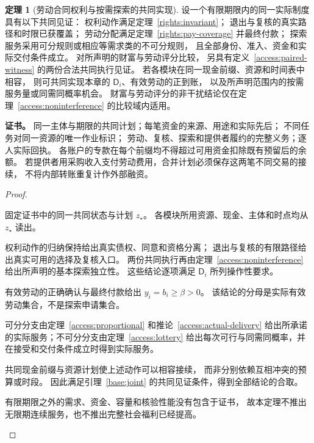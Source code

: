 \documentclass[UTF8,12pt,a4paper,openany,fontset=none,zihao=false]{ctexrep}
\theoremstyle{definition}
\newtheorem{theorem}{定理}[chapter]
\newenvironment{certificate}{\par\noindent\textbf{证书。}\ignorespaces}{\par}
\newcommand{\1}{\mathbf 1}
\begin{document}
\begin{theorem}[劳动合同权利与按需探索的共同实现]
\label{access:joint-rights}
设一个有限期限内的同一实际制度具有以下共同见证：
权利动作满足定理~\ref{rights:invariant}；
退出与复核的真实路径和时限已获覆盖；
劳动分配满足定理~\ref{rights:pay-coverage} 并最终付款；
探索服务采用可分规则或相应等需求类的不可分规则，
且全部身份、准入、资金和实际交付条件成立。
对所声明的财富与劳动评分比较，
另具有定义~\ref{access:paired-witness} 的两份合法共同执行见证。
若各模块在同一现金前缀、资源和时间表中相容，
则可共同实现本章的 \(\mathsf D_i\)、有效劳动的正到账，
以及所声明范围内的按需服务量或同需同概率机会。
财富与劳动评分的非干扰结论仅在定理~\ref{access:noninterference} 的比较域内适用。
\end{theorem}
\begin{certificate}
同一主体与期限的共同计划；每笔资金的来源、用途和实际先后；
不同任务对同一资源的唯一作业标识；
劳动、复核、探索和提供者履约的完整义务；逐人实际回执。
各账户的专款在每个前缀均不得超过可用资金扣除既有预留后的余额。
若提供者用采购收入支付劳动费用，合并计划必须保存这两笔不同交易的接续，
不将内部转账重复计作外部融资。
\end{certificate}
\begin{proof}
\begin{semanticsteps}
\item 固定证书中的同一共同状态与计划 \(z_\star\)。
各模块所用资源、现金、主体和时点均从 \(z_\star\) 读出。
\item 权利动作的归纳保持给出真实债权、同意和资格分离；
退出与复核的有限路径给出真实可用的选择及复核入口。
两份共同执行再由定理~\ref{access:noninterference} 给出所声明的基本探索独立性。
这些结论逐项满足 \(\mathsf D_i\) 所列操作性要求。
\item 有效劳动的正确确认与最终付款给出 \(y_i=b_i\ge\beta>0\)。
该结论的分母是实际有效劳动集合，不是探索申请集合。
\item 可分分支由定理~\ref{access:proportional} 和推论~\ref{access:actual-delivery}
给出所承诺的实际服务；不可分分支由定理~\ref{access:lottery}
给出每次可行与同需同概率，并在接受和交付条件成立时得到实际服务。
\item 共同现金前缀与资源计划使上述动作可以相容接续，
而非分别依赖互相冲突的预算或时段。
因此满足引理~\ref{base:joint} 的共同见证条件，得到全部结论的合取。
\item 有限期限之外的需求、资金、容量和核验性能没有包含于证书，
故本定理不推出无限期连续服务，也不推出完整社会福利已经提高。
\end{semanticsteps}
\end{proof}
\end{document}
